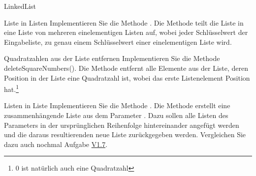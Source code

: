 \documentclass{../tuda-exercise}
\begin{document}
\begin{task}{LinkedList}
    \clearpagesolution

    \begin{subtask*}[credit=\stars{3}{3}]{Liste in Listen}
      \label{subtask:V1.7}
      Implementieren Sie die Methode .
      Die Methode teilt die Liste in eine Liste von mehreren einelementigen Listen auf, wobei
      jeder Schlüsselwert der Eingabeliste, zu genau einem Schlüsselwert einer einelementigen
      Liste wird.

      \begin{solution}
        
      \end{solution}
    \end{subtask*}

    \clearpagesolution

    \begin{subtask*}[credit=\stars{3}{3}]{Quadratzahlen aus der Liste entfernen}
      Implementieren Sie die Methode  deleteSquareNumbers(). Die Methode
      entfernt alle Elemente aus der Liste, deren Position in der Liste eine Quadratzahl ist,
      wobei das erste Listenelement Position  hat.\footnote{0 ist natürlich auch
      eine Quadratzahl}

      \begin{solution}
        
      \end{solution}
    \end{subtask*}

    \clearpagesolution

    \begin{subtask*}[credit=\stars{3}{3}]{Listen in Liste}
      Implementieren Sie die Methode
      .
      Die Methode erstellt eine zusammenhängende Liste aus dem Parameter . Dazu
      sollen alle Listen des Parameters  in der ursprünglichen Reihenfolge
      hintereinander angefügt werden und die daraus resultierenden neue Liste zurückgegeben
      werden. Vergleichen Sie dazu auch nochmal Aufgabe
      \hyperref[subtask:V1.7]{V1.7}.

      \begin{solution}
        
      \end{solution}
    \end{subtask*}
  \end{task}
\end{document}
